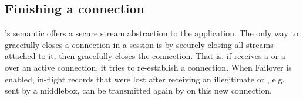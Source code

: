 \subsection{Finishing a \tcpls connection}

\tcpls's semantic offers a secure stream abstraction to the application.
The only way to gracefully closes a \tcp connection in a \tcpls session
is by securely closing all streams attached to it, then \tcpls gracefully closes the
\tcp connection. That is, if \tcpls receives a \rst or a \fin over an active
\tcp connection, it tries to re-establish a \tcp connection. 
When Failover is enabled, in-flight records that were lost after receiving 
an illegitimate \rst or \fin, e.g. sent by a middlebox, can be transmitted again by \tcpls
on this new \tcp connection.



